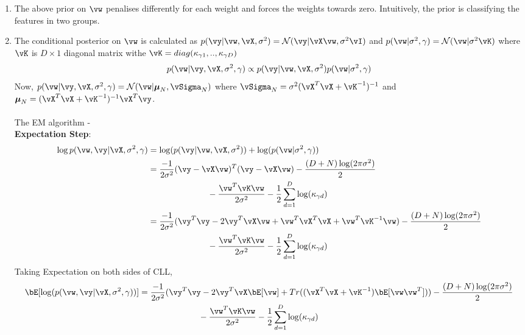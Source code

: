 \documentclass[a4paper,11pt]{article}
\begin{document}
\begin{pmisolution}
\begin{enumerate}
    \item The above prior on \(\vw\) penalises differently for each weight and forces the weights towards zero. Intuitively, the prior is classifying the features in two groups.
    \item The conditional posterior on \(\vw\) is calculated as     \(p(\vy|\vw,\vX, \sigma^2) = \mathcal{N}(\vy|\vX\vw,\sigma^2\vI)\) and \(p(\vw|\sigma^2, \gamma) = \mathcal{N}(\vw|\sigma^2\vK)\) where \(\vK\) is \(D\times 1 \) diagonal matrix withe \(\vK = diag(\kappa_{\gamma 1},..,\kappa_{\gamma D})\) 
    \[ p(\vw|\vy,\vX,\sigma^2, \gamma) \propto p(\vy|\vw,\vX, \sigma^2)p(\vw|\sigma^2, \gamma)\]
    Now, \(p(\vw|\vy,\vX,\sigma^2, \gamma) = \mathcal{N}(\vw|\boldsymbol\mu_N,\vSigma_N)\) where \(\vSigma_N = \sigma^2(\vX^T\vX + \vK^{-1})^{-1}\) and \(\boldsymbol\mu_N = (\vX^T\vX + \vK^{-1})^{-1}\vX^T\vy\).\\\\
    The EM algorithm -\\
    \textbf{Expectation Step}:
    \begin{align*}
        \log p(\vw,\vy | \vX,\sigma^2, \gamma) &= \log(p(\vy|\vw,\vX, \sigma^2)) + \log(p(\vw|\sigma^2, \gamma))\\
         &= \frac{-1}{2\sigma^2}(\vy - \vX\vw)^T(\vy - \vX\vw) - \frac{(D+N)\log(2\pi\sigma^2)}{2} \\
         & \hspace{7em}- \frac{\vw^T\vK\vw}{2\sigma^2} - \frac{1}{2}\sum_{d=1}^{D}\log (\kappa_{\gamma d})\\
         &= \frac{-1}{2\sigma^2}(\vy^T\vy - 2\vy^T\vX\vw + \vw^T\vX^T\vX + \vw^T\vK^{-1}\vw)
         - \frac{(D+N)\log(2\pi\sigma^2)}{2}\\
         & \hspace{7em} -\frac{\vw^T\vK\vw}{2\sigma^2} - \frac{1}{2}\sum_{d=1}^{D}\log (\kappa_{\gamma d})\\
    \end{align*}
    Taking Expectation on both sides of CLL,
    \begin{align*}
        \bE[\log(p(\vw,\vy|\vX,\sigma^2,\gamma))] &= \frac{-1}{2\sigma^2}(\vy^T\vy - 2\vy^T\vX\bE[\vw] + Tr((\vX^T\vX + \vK^{-1})\bE[\vw\vw^T]))
         - \frac{(D+N)\log(2\pi\sigma^2)}{2}\\
         & \hspace{7em} -\frac{\vw^T\vK\vw}{2\sigma^2} - \frac{1}{2}\sum_{d=1}^{D}\log (\kappa_{\gamma d})\\

\end{align*}
\end{enumerate}
\end{pmisolution}
\end{document}
